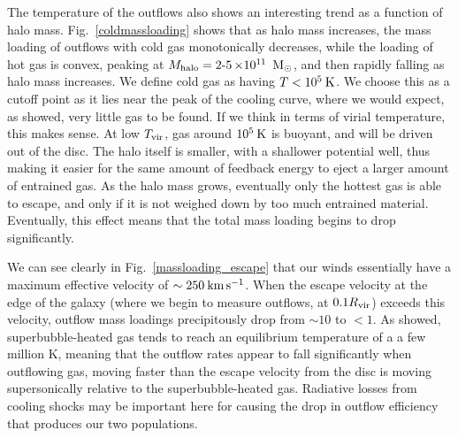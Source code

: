 The temperature of the outflows also shows an interesting trend as a function of
halo mass.  Fig.~\ref{coldmassloading} shows that as halo mass increases, the
mass loading of outflows with cold gas monotonically decreases, while the
loading of hot gas is convex, peaking at $M_{\rm halo} =
\operatorname{2-5}\times10^{11}\;\>{\rm M_{\odot}}$, and then rapidly falling as halo mass
increases.  We define cold gas as having $T<10^5\>{\rm K}$.  We choose this as a cutoff
point as it lies near the peak of the cooling curve, where we would expect, as
\citet{Woods2014} showed, very little gas to be found.  If we think in terms of
virial temperature, this makes sense.  At low $T_{\rm vir}$, gas around $10^5\>{\rm K}$ is
buoyant, and will be driven out of the disc.  The halo itself is smaller, with a
shallower potential well, thus making it easier for the same amount of feedback
energy to eject a larger amount of entrained gas.  As the halo mass grows,
eventually only the hottest gas is able to escape, and only if it is not weighed
down by too much entrained material.  Eventually, this effect means that the
total mass loading begins to drop significantly.

We can see clearly in Fig.~\ref{massloading_escape} that our winds essentially
have a maximum effective velocity of $\sim250\>{\rm km}\,{\rm s}^{-1}$.  When the escape velocity
at the edge of the galaxy (where we begin to measure outflows, at $0.1R_{\rm vir}$)
exceeds this velocity, outflow mass loadings precipitously drop from $\sim10$ to
$<1$.  As \citet{Keller2014} showed, superbubble-heated gas tends to reach an
equilibrium temperature of a a few million K, meaning that the
outflow rates appear to fall significantly when outflowing gas, moving faster
than the escape velocity from the disc is moving supersonically relative to the
superbubble-heated gas.  Radiative losses from cooling shocks may be important
here for causing the drop in outflow efficiency that produces our two
populations.

